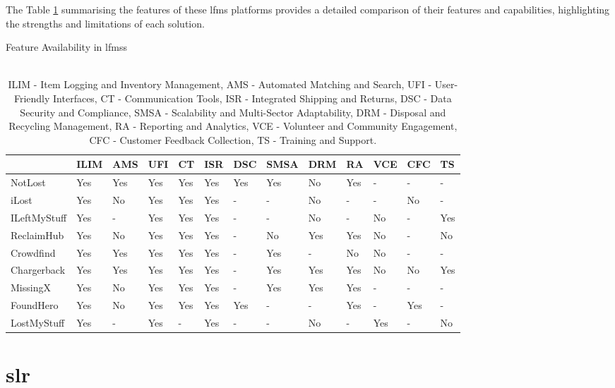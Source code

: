The Table \ref{tab:lfms_features} summarising the features of these \ac{lfms} platforms provides a detailed comparison of their features and capabilities, highlighting the strengths and limitations of each solution.

\begin{table}[!htb]
\centering
\caption{Feature Availability in \acl{lfms}s}
\begin{tabular}{lllllllllllll}
    \toprule
    {} & ILIM & AMS & UFI & CT & ISR & DSC & SMSA & DRM & RA & VCE & CFC & TS \\
    \midrule
    NotLost & Yes & Yes & Yes & Yes & Yes & Yes & Yes & No & Yes & - & - & - \\
    iLost & Yes & No & Yes & Yes & Yes & - & - & No & - & - & No & - \\
    ILeftMyStuff & Yes & - & Yes & Yes & Yes & - & - & No & - & No & - & Yes \\
    ReclaimHub & Yes & No & Yes & Yes & Yes & - & No & Yes & Yes & No & - & No \\
    Crowdfind & Yes & Yes & Yes & Yes & Yes & - & Yes & - & No & No & - & - \\
    Chargerback & Yes & Yes & Yes & Yes & Yes & - & Yes & Yes & Yes & No & No & Yes \\
    MissingX & Yes & No & Yes & Yes & Yes & - & Yes & Yes & Yes & - & - & - \\
    FoundHero & Yes & No & Yes & Yes & Yes & Yes & - & - & Yes & - & Yes & - \\
    LostMyStuff & Yes & - & Yes & - & Yes & - & - & No & - & Yes & - & No \\
    \bottomrule
\end{tabular}
\caption*{\\ILIM - Item Logging and Inventory Management, AMS - Automated Matching and Search, UFI - User-Friendly Interfaces, CT - Communication Tools, ISR - Integrated Shipping and Returns, DSC - Data Security and Compliance, SMSA - Scalability and Multi-Sector Adaptability, DRM - Disposal and Recycling Management, RA - Reporting and Analytics, VCE - Volunteer and Community Engagement, CFC - Customer Feedback Collection, TS - Training and Support.}
\label{tab:lfms_features}
\end{table}


\section{\acl{slr}} \label{chapter:literature-review}

